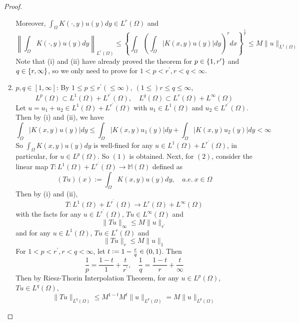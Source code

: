 \begin{proof}
\begin{enumerate}[label=(\roman*)]
		Moreover, $\int_{\Omega} K(\cdot, y) u(y) d y \in L^r(\Omega)$ and
		\begin{equation*}
			\left\|\int_{\Omega} K(\cdot, y) u(y) d y\right\|_{L^r(\Omega)} \leq\left\{\int_{\Omega}\left(\int_{\Omega}|K(x, y) u(y)| d y\right)^r d x\right\}^{\frac{1}{r}} \leq M\|u\|_{L^1(\Omega)}
		\end{equation*}
		Note that (i) and (ii) have already proved the theorem for $p \in \left\{1,r^\prime\right\}$ and $q \in \left\{r,\infty\right\}$, so we only need to prove for $1<p<r^{\prime}, r<q<\infty$.
		\item $p,q \in [1,\infty]$: By $1 \leq p \leq r^{\prime}(\leq \infty),~(1 \leq) r \leq q \leq \infty$,
		\begin{equation*}
			L^p(\Omega) \subset L^1(\Omega)+L^{r^{\prime}}(\Omega), \quad L^q(\Omega) \subset L^r(\Omega)+L^{\infty}(\Omega)
		\end{equation*}
		Let $u = u_1 + u_2 \in L^1(\Omega)+L^{r^{\prime}}(\Omega)$ with $u_1 \in L^1(\Omega)$ and $u_2 \in L^{r^{\prime}}(\Omega)$. Then by (i) and (ii), we have
		\begin{equation*}
			\int_{\Omega}|K(x, y) u(y)| d y \leq \int_{\Omega}\left|K(x, y) u_1(y)\right| d y+\int_{\Omega}\left|K(x, y) u_2(y)\right| d y<\infty
		\end{equation*}
		So $\int_{\Omega} K(x, y) u(y) d y$ is well-fined for any $u \in L^1(\Omega)+L^{r^{\prime}}(\Omega)$, in particular, for $u \in L^p(\Omega)$. So $(1)$ is obtained. Next, for $(2)$, consider the linear map $T \colon L^1(\Omega)+L^{r^{\prime}}(\Omega) \rightarrow \mathbb{M}(\Omega)$ defined as
		\begin{equation*}
			(T u)(x):=\int_{\Omega} K(x, y) u(y) d y,\quad a.e.~x \in \Omega
		\end{equation*}
		Then by (i) and (ii),
		\begin{equation*}
			T \colon L^1(\Omega)+L^{r^{\prime}}(\Omega) \rightarrow L^r(\Omega)+L^{\infty}(\Omega)
		\end{equation*}
		with the facts for any $u \in L^{r^{\prime}}(\Omega)$, $T u \in L^{\infty}(\Omega)$ and
		\begin{equation*}
			\|T u\|_{\infty} \leq M\|u\|_{r^{\prime}}
		\end{equation*}
		and for any $u \in L^1(\Omega)$, $Tu \in L^r(\Omega)$ and
		\begin{equation*}
			\|T u\|_{r} \leq M\|u\|_{1}
		\end{equation*}
		For $1<p<r^{\prime}, r<q<\infty$, let $t \vcentcolon= 1- \frac{r}{q} \in (0,1)$. Then
		\begin{equation*}
			\frac{1}{p}=\frac{1-t}{1}+\frac{t}{r^{\prime}}, \quad \frac{1}{q}=\frac{1-t}{r}+\frac{t}{\infty}
		\end{equation*}
		Then by Riesz-Thorin Interpolation Theorem, for any $u \in L^p(\Omega)$, $Tu \in L^q(\Omega)$,
		\begin{equation*}
			\|T u\|_{L^q(\Omega)} \leq M^{1-t} M^t\|u\|_{L^p(\Omega)}=M\|u\|_{L^p(\Omega)}
		\end{equation*}
	\end{enumerate}
\end{proof}

